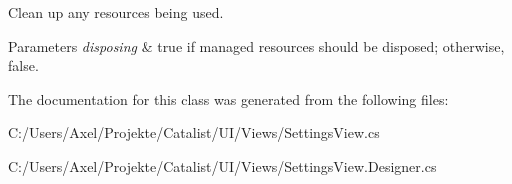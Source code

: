 Clean up any resources being used. 


\begin{DoxyParams}{Parameters}
{\em disposing} & true if managed resources should be disposed; otherwise, false.\\
\hline
\end{DoxyParams}


The documentation for this class was generated from the following files\+:\begin{DoxyCompactItemize}
\item 
C\+:/\+Users/\+Axel/\+Projekte/\+Catalist/\+U\+I/\+Views/Settings\+View.\+cs\item 
C\+:/\+Users/\+Axel/\+Projekte/\+Catalist/\+U\+I/\+Views/Settings\+View.\+Designer.\+cs\end{DoxyCompactItemize}
